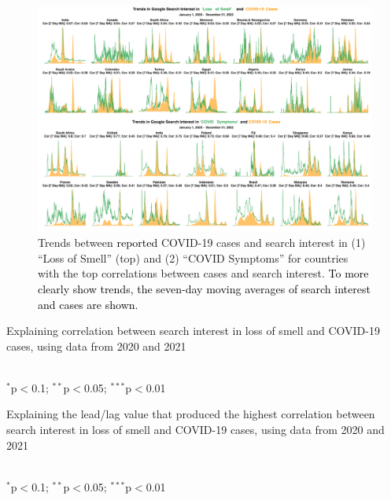 \documentclass{article}
\begin{document}
\begin{figure}[t]
    \includegraphics[width=1\textwidth]{figures/cases_vs_loss_of_smell_covid_symptoms_trends_topcountries.png}
    \caption{Trends between \textcolor{black}{reported} COVID-19 cases and search interest in (1) ``Loss of Smell'' (top) and (2) ``COVID Symptoms'' for countries with the top correlations between cases and search interest. \textcolor{black}{To more clearly show trends, the seven-day moving averages of search interest and cases are shown.}}
    \label{fig:cor_trends_figure}
\end{figure}

\setlength{\tabcolsep}{4pt}
\begin{table}[t!]
\centering
\caption{Explaining correlation between search interest in loss of smell and COVID-19 cases, using data from 2020 and 2021}
 \\
\flushleft $^{*}$p$<$0.1; $^{**}$p$<$0.05; $^{***}$p$<$0.01
\label{tab:cor_reg_table}
\end{table}

\setlength{\tabcolsep}{4pt}
\begin{table}[t!]
\centering
\caption{Explaining the lead/lag value that produced the highest correlation between search interest in loss of smell and COVID-19 cases, using data from 2020 and 2021}
 \\
\flushleft $^{*}$p$<$0.1; $^{**}$p$<$0.05; $^{***}$p$<$0.01
\label{tab:lag_reg_table}
\end{table}
\end{document}
